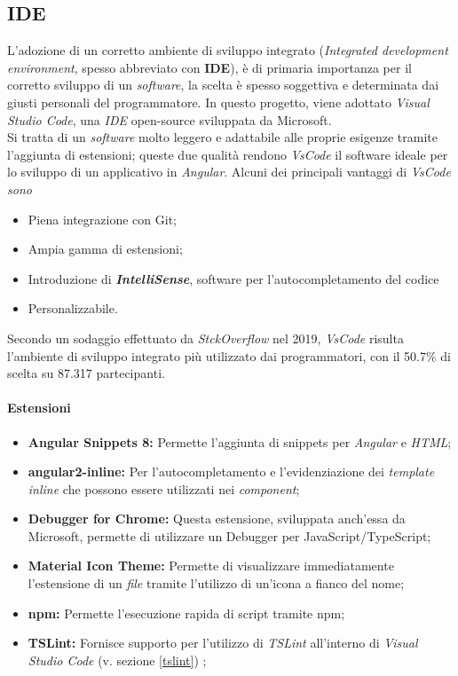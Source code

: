 \subsection{IDE}
L'adozione di un corretto ambiente di sviluppo integrato (\textit{Integrated development environment}, spesso abbreviato con \textbf{IDE}), è di primaria importanza per il corretto sviluppo di un \textit{software}, la scelta è spesso soggettiva e determinata dai giusti personali del programmatore.
In questo progetto, viene adottato \textit{Visual Studio Code}, una \textit{IDE} \gls{open-source} sviluppata da Microsoft.\\
Si tratta di un \textit{software} molto leggero e adattabile alle proprie esigenze tramite l'aggiunta di estensioni; queste due qualità rendono \textit{VsCode} il software ideale per lo sviluppo di un applicativo in \textit{Angular}.
Alcuni dei principali vantaggi di \textit{VsCode sono}
\begin{itemize}
	\item Piena integrazione con \gls{Git};
	\item Ampia gamma di estensioni;
	\item Introduzione di \textbf{\textit{IntelliSense}}, software per l'autocompletamento del codice
	\item Personalizzabile.
\end{itemize}
Secondo un sodaggio effettuato da \textit{StckOverflow} nel 2019, \textit{VsCode} risulta l'ambiente di sviluppo integrato più utilizzato dai programmatori, con il 50.7\% di scelta su 87.317 partecipanti.


\paragraph{Estensioni}
\begin{itemize}
	\item \textbf{Angular Snippets 8:} Permette l'aggiunta di \gls{snippets} per \textit{Angular} e \textit{HTML};
	\item \textbf{angular2-inline:} Per l'autocompletamento e l'evidenziazione dei \textit{template inline} che possono essere utilizzati nei \textit{component};
	\item \textbf{Debugger for Chrome:} Questa estensione, sviluppata anch'essa da Microsoft, permette di utilizzare un \gls{Debugger} per JavaScript/TypeScript;
	\item \textbf{Material Icon Theme:} Permette di visualizzare immediatamente l'estensione di un \textit{file} tramite l'utilizzo di un'icona a fianco del nome;
	\item \textbf{npm:} Permette l'esecuzione rapida di script tramite \gls{npm};
	\item \textbf{TSLint:} Fornisce supporto per l'utilizzo di \textit{TSLint} all'interno di \textit{Visual Studio Code} (v. sezione \ref{tslint}) ;
\end{itemize}

